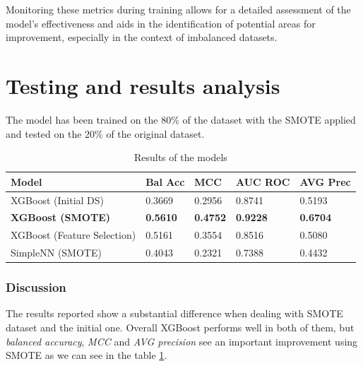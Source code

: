 \documentclass[10pt,twocolumn,letterpaper]{article}
\begin{document}
Monitoring these metrics during training allows for a detailed assessment of the model's effectiveness and aids in the identification of potential areas for improvement, especially in the context of imbalanced datasets.

\section{Testing and results analysis}
The model has been trained on the 80\% of the dataset with the SMOTE applied and tested on the 20\% of the original dataset.
\begin{table}[h!]
    \centering
    \begin{tabular}{|p{1.6cm}|p{1.2cm}|p{1.2cm}|p{1.2cm}|p{1.2cm}|}
    \hline
    \textbf{Model} & \textbf{Bal Acc} & \textbf{MCC} & \textbf{AUC ROC} & \textbf{AVG Prec} \\
    \hline
    XGBoost (Initial DS) & 0.3669 & 0.2956 & 0.8741 & 0.5193 \\
    \hline
    \textbf{XGBoost (SMOTE)} & \textbf{0.5610} & \textbf{0.4752} & \textbf{0.9228} & \textbf{0.6704} \\
    \hline
    XGBoost (Feature Selection) & 0.5161 & 0.3554 & 0.8516 & 0.5080 \\
    \hline
    SimpleNN (SMOTE) & 0.4043 & 0.2321 & 0.7388 & 0.4432 \\ %
    \hline
    \end{tabular}
    \caption{Results of the models}
    \label{tab:results}
\end{table}

\subsubsection{Discussion}
The results reported show a substantial difference when dealing with SMOTE dataset and the initial one. Overall XGBoost performs well in both of them, but \textit{balanced accuracy}, \textit{MCC} and \textit{AVG precision} see an important improvement using SMOTE as we can see in the table \ref{tab:results}. 
\end{document}
